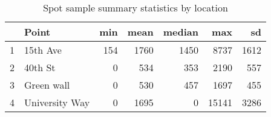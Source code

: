 \begin{table}[ht]
\centering
\begin{tabular}{rlrrrrr}
  \hline
 & Point & min & mean & median & max & sd \\ 
  \hline
1 & 15th Ave & 154 & 1760 & 1450 & 8737 & 1612 \\ 
  2 & 40th St & 0 & 534 & 353 & 2190 & 557 \\ 
  3 & Green wall & 0 & 530 & 457 & 1697 & 455 \\ 
  4 & University Way & 0 & 1695 & 0 & 15141 & 3286 \\ 
   \hline
\end{tabular}
\caption{Spot sample summary statistics by location} 
\end{table}
